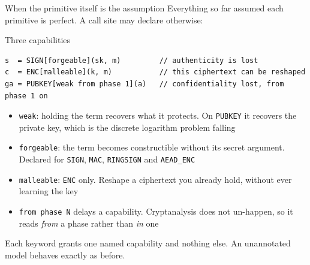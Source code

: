 \ifdefined\PRESENTATION\else\PassOptionsToClass{handout}{beamer}\fi\documentclass[aspectratio=169, lualatex]{beamer}
\begin{document}
\begin{frame}[fragile]{When the primitive itself is the assumption}
	\footnotesize
	Everything so far assumed each primitive is perfect. A call site may declare otherwise:
	\begin{vpmodel}{Three capabilities}
		\begin{lstlisting}
s  = SIGN[forgeable](sk, m)         // authenticity is lost
c  = ENC[malleable](k, m)           // this ciphertext can be reshaped
ga = PUBKEY[weak from phase 1](a)   // confidentiality lost, from phase 1 on
\end{lstlisting}
	\end{vpmodel}
	\vspace{0.3em}
	\begin{itemize}
		\item \texttt{weak}: holding the term recovers what it protects. On \texttt{PUBKEY} it recovers the private key, which is the discrete logarithm problem falling
		\item \texttt{forgeable}: the term becomes constructible without its secret argument. Declared for \texttt{SIGN}, \texttt{MAC}, \texttt{RINGSIGN} and \texttt{AEAD\_ENC}
		\item \texttt{malleable}: \texttt{ENC} only. Reshape a ciphertext you already hold, without ever learning the key
		\item \texttt{from phase N} delays a capability. Cryptanalysis does not un-happen, so it reads \textit{from} a phase rather than \textit{in} one
	\end{itemize}
	\begin{center}
		Each keyword grants one named capability and nothing else. An unannotated model behaves exactly as before.
	\end{center}
\end{frame}
\end{document}
